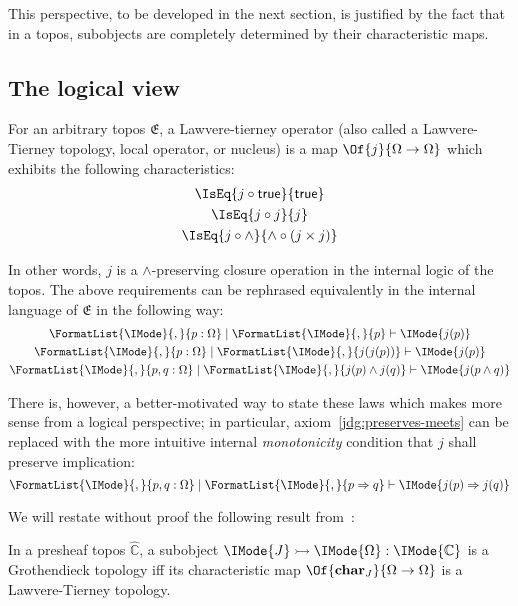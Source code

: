 \documentclass{article}
\newcommand\Char[1]{\mathbf{char}_{#1}}
\newcommand\Psh[1]{\widehat{#1}}
\newcommand\IsSubobject[3]{\IMode{#1}\rightarrowtail\IMode{#2}:\IMode{#3}}
\newcommand\True{\mathsf{true}}
\begin{document}
This perspective, to be developed in the next section, is justified by
the fact that in a topos, subobjects are completely determined by
their characteristic maps.

\subsection{The logical view}

\newcommand\Seq[3]{\FormatList{\IMode}{,}{#1}\mid\FormatList{\IMode}{,}{#2}\vdash\IMode{#3}}

\begin{definition}\label{def:lawvere-tierney}
  For an arbitrary topos $\mathfrak{E}$, a Lawvere-tierney operator
  (also called a Lawvere-Tierney topology, local operator, or nucleus)
  is a map $\Of{j}{\Omega\to\Omega}$ which exhibits the following
  characteristics:
  \begin{gather}
    \IsEq{j\circ\True}{\True}
    \label{eq:preserves-true}
    \\
    \IsEq{j\circ j}{j}
    \label{eq:idempotency}
    \\
    \IsEq{j\circ\land}{\land\circ(j\times j)}
    \label{eq:preserves-meets}
  \end{gather}
\end{definition}


In other words, $j$ is a $\land$-preserving closure operation in the
internal logic of the topos. The above requirements can be rephrased
equivalently in the internal language of $\mathfrak{E}$ in the
following way:
\begin{gather}
  \Seq{p:\Omega}{p}{j(p)}
  \\
  \Seq{p:\Omega}{j(j(p))}{j(p)}
  \label{jdg:idempotency}
  \\
  \Seq{p,q:\Omega}{j(p)\land j(q)}{j(p\land q)}
  \label{jdg:preserves-meets}
\end{gather}


There is, however, a better-motivated way to state these laws which
makes more sense from a logical perspective; in particular,
axiom~\ref{jdg:preserves-meets} can be replaced with the more
intuitive internal \emph{monotonicity} condition that $j$ shall
preserve implication:
\begin{equation}
  \Seq{p,q:\Omega}{p\Rightarrow q}{j(p)\Rightarrow j(q)}
  \label{jdg:monotonicity}
\end{equation}

We will restate without proof the following result
from~\cite{maclane-moerdijk:1992}:
\begin{prop}
  In a presheaf topos $\Psh{\mathbb{C}}$, a subobject
  $\IsSubobject{J}{\Omega}{\mathbb{C}}$ is a Grothendieck topology iff
  its characteristic map $\Of{\Char{J}}{\Omega\to\Omega}$ is a
  Lawvere-Tierney topology.
\end{prop}
\end{document}
